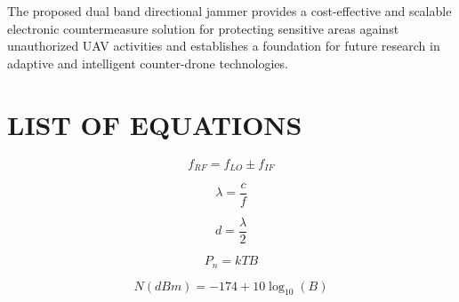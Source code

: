 \documentclass[12pt,a4paper]{report}
\begin{document}
	The proposed dual band directional jammer provides a cost-effective and scalable electronic countermeasure solution for protecting sensitive areas against unauthorized UAV activities and establishes a foundation for future research in adaptive and intelligent counter-drone technologies.
	
	
	\clearpage
	\tableofcontents
	
	\clearpage
	\listoffigures
	
	\clearpage
	\listoftables
	
	\clearpage
	\chapter*{LIST OF EQUATIONS}
	
	\begin{equation}
		f_{RF}=f_{LO}\pm f_{IF}
		\label{eq:mixer_frequency}
	\end{equation}
	
	\begin{equation}
		\lambda=\frac{c}{f}
		\label{eq:wavelength}
	\end{equation}
	
	\begin{equation}
		d=\frac{\lambda}{2}
		\label{eq:antenna_spacing}
	\end{equation}
	
	\begin{equation}
		P_n=kTB
		\label{eq:noise_power}
	\end{equation}
	
	\begin{equation}
		N(dBm)=-174+10\log_{10}(B)
		\label{eq:thermal_noise_dbm}
	\end{equation}
	
\end{document}
